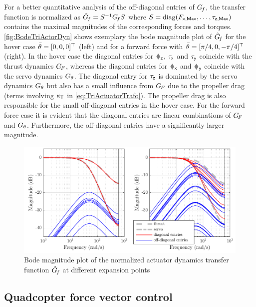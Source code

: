 For a better quantitative analysis of the off-diagonal entries of $G_{\hspace{-0.3ex}f}$, the transfer function is normalized as $\tilde{G}_{\hspace{-0.3ex}f} = S^{-1} G_{\hspace{-0.3ex}f} S $ where $S = \operatorname{diag}(F_{\mathsf{x,Max}}, \ldots, \tau_{\mathsf{z,Max}})$ contains the maximal magnitudes of the corresponding forces and torques.
\autoref{fig:BodeTriActorDyn} shows exemplary the bode magnitude plot of $\tilde{G}_{\hspace{-0.3ex}f}$ for the hover case $\bar{\theta}_{} = [0,0,0]^\top$ (left) and for a forward force with $\bar{\theta}_{} = [\pi / 4,0,-\pi / 4]^\top$ (right).
In the hover case the diagonal entries for $\Fz$, $\tau_{\mathsf{x}}$ and $\tau_{\mathsf{y}}$ coincide with the thrust dynamics $G_{\hspace{-0.3ex}F}$, whereas the diagonal entries for $\Fx$ and $\Fy$ coincide with the servo dynamics $G_{\theta}$.
The diagonal entry for $\tau_{\mathsf{z}}$ is dominated by the servo dynamics $G_{\theta}$ but also has a small influence from $G_{\hspace{-0.3ex}F}$ due to the propeller drag (terms involving $\kappa_{\mathsf{T}}$ in \eqref{eq:TriActuatorTrafo}).
The propeller drag is also responsible for the small off-diagonal entries in the hover case.
For the forward force case it is evident that the diagonal entries are linear combinations of $G_{\hspace{-0.3ex}F}$ and $G_{\theta}$.
Furthermore, the off-diagonal entries have a significantly larger magnitude.

\begin{figure}
 \centering
 \includegraphics{graphics/TriActuatorDynamics/BodeTriActorDyn.pdf}
 \caption{Bode magnitude plot of the normalized \Tricopter actuator dynamics transfer function $\tilde{G}_{\hspace{-0.3ex}f}$ at different expansion points}
 \label{fig:BodeTriActorDyn}
\end{figure}


\subsection{Quadcopter force vector control}
